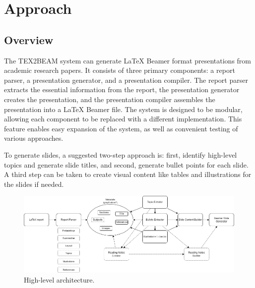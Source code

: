 \chapter{Approach}
\label{ch:approach}


\section{Overview}

The TEX2BEAM system can generate LaTeX Beamer format presentations from academic research papers. It consists of three primary components: a report parser, a presentation generator, and a presentation compiler. The report parser extracts the essential information from the report, the presentation generator creates the presentation, and the presentation compiler assembles the presentation into a LaTeX Beamer file. The system is designed to be modular, allowing each component to be replaced with a different implementation. This feature enables easy expansion of the system, as well as convenient testing of various approaches.

To generate slides, a suggested two-step approach is: first, identify high-level topics and generate slide titles, and second, generate bullet points for each slide. A third step can be taken to create visual content like tables and illustrations for the slides if needed.

\begin{figure}
    \centering
    \includegraphics[width=1\linewidth]{images/High-Level Architecture Diagram.png}
    \caption{High-level architecture.}
    \label{fig:high-level-architecture}
\end{figure}

